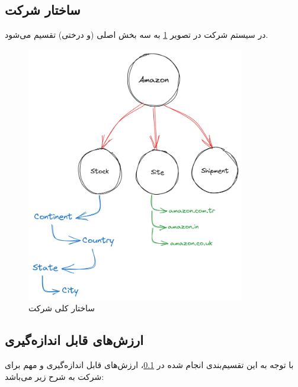 \documentclass[12pt]{article}
\begin{document}
\subsection{ساختار شرکت}\label{amz-struct}
در سیستم  شرکت  در تصویر \ref{amz-s3} به سه بخش اصلی (و درختی) تقسیم می‌شود.
\begin{figure}[b]
\begin{center}
    \includegraphics[width=0.85\textwidth, height=0.75\textheight]{../images/amazon-s3-comp(2)}
\end{center} 
\caption{ساختار کلی شرکت }\label{amz-s3}
\end{figure}

\subsection{ارزش‌های قابل‌ اندازه‌گیری}\label{intro-movs}
با توجه به این تقسیم‌بندی انجام شده در \ref{amz-struct}، ارزش‌های قابل‌ اندازه‌گیری \label{movs}
و مهم برای شرکت  به شرح زیر می‌باشد:
\end{document}
